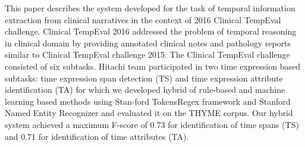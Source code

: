 This paper describes the system developed for the task of temporal information extraction from clinical narratives in the context of 2016 Clinical TempEval challenge. Clinical TempEval 2016 addressed the problem of temporal reasoning in clinical domain by providing annotated clinical notes and pathology reports similar to Clinical TempEval challenge 2015. The Clinical TempEval challenge consisted of six subtasks. Hitachi team participated in two time expression based subtasks: time expression span detection (TS) and time expression attribute identification (TA) for which we developed hybrid of rule-based and machine learning based methods using Stan-ford TokensRegex framework and Stanford Named Entity Recognizer and evaluated it on the THYME corpus. Our hybrid system achieved a maximum F-score of 0.73 for identification of time spans (TS) and 0.71 for identification of time attributes (TA).
